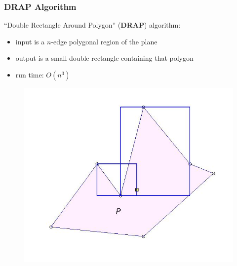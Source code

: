 \documentclass[compress]{beamer}
\begin{document}
\begin{frame} \frametitle{DRAP Algorithm}
``Double Rectangle Around Polygon'' (\textbf{DRAP}) algorithm:\\
\begin{itemize}
     \item input is a $n$-edge polygonal region of the plane
    \item output is a small double rectangle containing that polygon
    \item run time: $O(n^3)$
\end{itemize}

    \begin{figure}
    \includegraphics[scale=0.3]{drap3.jpg}
    \end{figure}

\transboxout
\end{frame}
\end{document}
